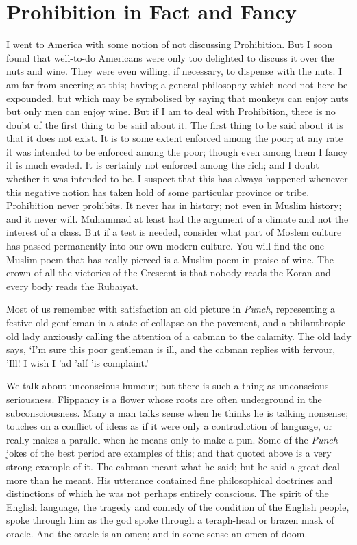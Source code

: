 \documentclass{book}
\begin{document}
\chapter{Prohibition in Fact and Fancy}
\label{chapter-8}
I went to America with some notion of not discussing Prohibition. But I soon found that well-to-do Americans were only too delighted to discuss it over the nuts and wine. They were even willing, if necessary, to dispense with the nuts. I am far from sneering at this; having a general philosophy which need not here be expounded, but which may be symbolised by saying that monkeys can enjoy nuts but only men can enjoy wine. But if I am to deal with Prohibition, there is no doubt of the first thing to be said about it. The first thing to be said about it is that it does not exist. It is to some extent enforced among the poor; at any rate it was intended to be enforced among the poor; though even among them I fancy it is much evaded. It is certainly not enforced among the rich; and I doubt whether it was intended to be. I suspect that this has always happened whenever this negative notion has taken hold of some particular province or tribe. Prohibition never prohibits. It never has in history; not even in Muslim history; and it never will. Muhammad at least had the argument of a climate and not the interest of a class. But if a test is needed, consider what part of Moslem culture has passed permanently into our own modern culture. You will find the one Muslim poem that has really pierced is a Muslim poem in praise of wine. The crown of all the victories of the Crescent is that nobody reads the Koran and every body reads the Rubaiyat.

Most of us remember with satisfaction an old picture in \emph{Punch}, representing a festive old gentleman in a state of collapse on the pavement, and a philanthropic old lady anxiously calling the attention of a cabman to the calamity. The old lady says, ‘I’m sure this poor gentleman is ill, and the cabman replies with fervour, ’Ill! I wish I ’ad ’alf ’is complaint.’

We talk about unconscious humour; but there is such a thing as unconscious seriousness. Flippancy is a flower whose roots are often underground in the subconsciousness. Many a man talks sense when he thinks he is talking nonsense; touches on a conflict of ideas as if it were only a contradiction of language, or really makes a parallel when he means only to make a pun. Some of the \emph{Punch} jokes of the best period are examples of this; and that quoted above is a very strong example of it. The cabman meant what he said; but he said a great deal more than he meant. His utterance contained fine philosophical doctrines and distinctions of which he was not perhaps entirely conscious. The spirit of the English language, the tragedy and comedy of the condition of the English people, spoke through him as the god spoke through a teraph-head or brazen mask of oracle. And the oracle is an omen; and in some sense an omen of doom.
\end{document}
